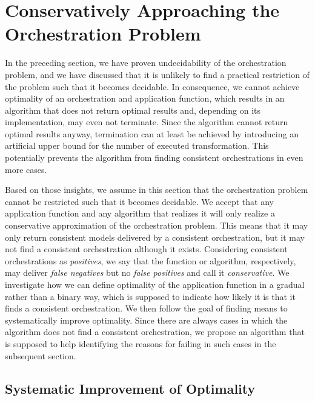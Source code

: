 \section{Conservatively Approaching the Orchestration Problem}

In the preceding section, we have proven undecidability of the orchestration problem, and we have discussed that it is unlikely to find a practical restriction of the problem such that it becomes decidable.
In consequence, we cannot achieve optimality of an orchestration and application function, which results in an 
algorithm that does not return optimal results and, depending on its implementation, may even not terminate.
Since the algorithm cannot return optimal results anyway, termination can at least be achieved by introducing an artificial upper bound for the number of executed transformation.
This potentially prevents the algorithm from finding consistent orchestrations in even more cases.

Based on those insights, we assume in this section that the orchestration problem cannot be restricted such that it becomes decidable.
We accept that any application function and any algorithm that realizes it will only realize a conservative approximation of the orchestration problem.
This means that it may only return consistent models delivered by a consistent orchestration, but it may not find a consistent orchestration although it exists.
Considering consistent orchestrations as \emph{positives}, we say that the function or algorithm, respectively, may deliver \emph{false negatives} but no \emph{false positives} and call it \emph{conservative}.
We investigate how we can define optimality of the application function in a gradual rather than a binary way, which is supposed to indicate how likely it is that it finds a consistent orchestration.
We then follow the goal of finding means to systematically improve optimality.
Since there are always cases in which the algorithm does not find a consistent orchestration, we propose an algorithm that is supposed to help identifying the reasons for failing in such cases in the subsequent section.


\subsection{Systematic Improvement of Optimality}
\label{chap:orchestration:conservative:improvement}

